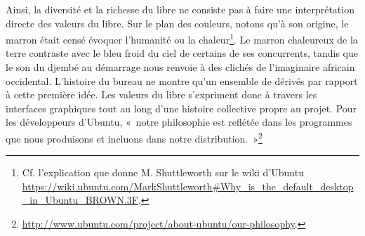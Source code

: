\documentclass{FramateX}
\begin{document}
\begin{refsection}
Ainsi, la diversité et la richesse du libre ne consiste pas à faire une
interprétation directe des valeurs du libre. Sur le plan des couleurs,
notons qu'à son origine, le marron était censé évoquer l'humanité ou la
chaleur\footnote{Cf. l'explication que donne M. Shuttleworth sur le wiki d'Ubuntu
\url{https://wiki.ubuntu.com/MarkShuttleworth\#Why_is_the_default_desktop_in_Ubuntu_BROWN.3F}.}. Le marron chaleureux de la terre contraste avec le bleu froid du
ciel de certains de ses concurrents, tandis que le son du djembé au
démarrage nous renvoie à des clichés de l'imaginaire africain
occidental. L'histoire du bureau ne montre qu'un ensemble de dérivés
par rapport à cette première idée. Les valeurs du libre s'expriment
donc à travers les interfaces graphiques tout au long d'une histoire
collective propre au projet. Pour les développeurs d'Ubuntu, «~notre
philosophie est reflétée dans les programmes que nous produisons et
incluons dans notre distribution.~»\footnote{\url{http://www.ubuntu.com/project/about-ubuntu/our-philosophy}.}


\end{refsection}
\end{document}
